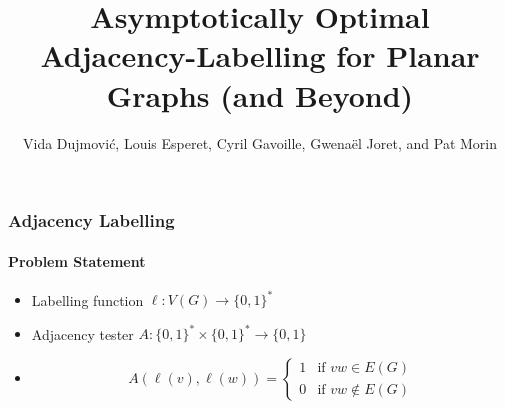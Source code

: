 \documentclass[aspectratio=169,xcolor=dvipsnames]{beamer}
\title{Asymptotically Optimal Adjacency-Labelling for Planar Graphs\newline
 (and Beyond)}
\author{Vida Dujmović, Louis Esperet, Cyril Gavoille, Gwenaël Joret, and Pat Morin}
\begin{document}
\begin{frame}
  \titlepage
\end{frame}

\begin{frame}
  \frametitle{Adjacency Labelling}
  \framesubtitle{Problem Statement}

  \begin{itemize}
    \item<+->[] Labelling function $\ell:V(G)\to\{0,1\}^*$
    \item<+->[] Adjacency tester $A:\{0,1\}^*\times\{0,1\}^*\to \{0,1\}$
    \item<+->[]
        \[
            A(\ell(v),\ell(w)) = \begin{cases}
                1 & \text{if $vw\in E(G)$} \\
                0 & \text{if $vw\not\in E(G)$}
        \end{cases}
        \]
    \end{itemize}
\end{frame}
\end{document}
